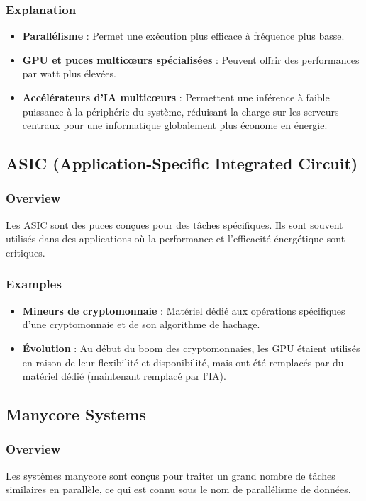 \documentclass[10pt,a4paper]{article}
\begin{document}
\subsubsection*{Explanation}
\begin{itemize}
    \item \textbf{Parallélisme} : Permet une exécution plus efficace à fréquence plus basse.
    \item \textbf{GPU et puces multicœurs spécialisées} : Peuvent offrir des performances par watt plus élevées.
    \item \textbf{Accélérateurs d'IA multicœurs} : Permettent une inférence à faible puissance à la périphérie du système, réduisant la charge sur les serveurs centraux pour une informatique globalement plus économe en énergie.
\end{itemize}

\subsection*{ASIC (Application-Specific Integrated Circuit)}

\subsubsection*{Overview}
Les ASIC sont des puces conçues pour des tâches spécifiques. Ils sont souvent utilisés dans des applications où la performance et l'efficacité énergétique sont critiques.

\subsubsection*{Examples}
\begin{itemize}
    \item \textbf{Mineurs de cryptomonnaie} : Matériel dédié aux opérations spécifiques d'une cryptomonnaie et de son algorithme de hachage.
    \item \textbf{Évolution} : Au début du boom des cryptomonnaies, les GPU étaient utilisés en raison de leur flexibilité et disponibilité, mais ont été remplacés par du matériel dédié (maintenant remplacé par l'IA).
\end{itemize}

\subsection*{Manycore Systems}

\subsubsection*{Overview}
Les systèmes manycore sont conçus pour traiter un grand nombre de tâches similaires en parallèle, ce qui est connu sous le nom de parallélisme de données.
\end{document}
